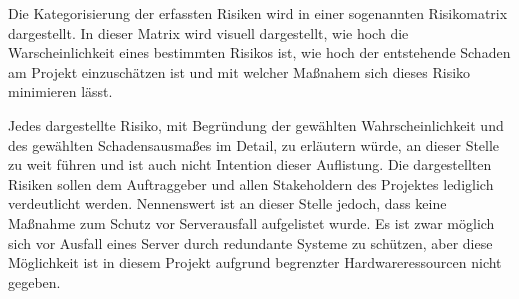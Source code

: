Die Kategorisierung der erfassten Risiken wird in einer sogenannten Risikomatrix
dargestellt. In dieser Matrix wird visuell dargestellt, wie hoch die Warscheinlichkeit eines
bestimmten Risikos ist, wie hoch der entstehende Schaden am Projekt
einzuschätzen ist und mit welcher Maßnahem sich dieses Risiko minimieren lässt.

\clearpage
{}

Jedes dargestellte Risiko, mit Begründung der gewählten Wahrscheinlichkeit und des gewählten
Schadensausmaßes im Detail, zu erläutern würde, an dieser Stelle zu weit führen
und ist auch nicht Intention dieser Auflistung. Die dargestellten Risiken
sollen dem Auftraggeber und allen Stakeholdern des Projektes lediglich verdeutlicht
werden. Nennenswert ist an dieser Stelle jedoch, dass keine Maßnahme zum Schutz vor
Serverausfall aufgelistet wurde. Es ist zwar möglich sich vor
Ausfall eines Server durch redundante Systeme zu schützen, aber diese Möglichkeit
ist in diesem Projekt aufgrund begrenzter Hardwareressourcen nicht gegeben.